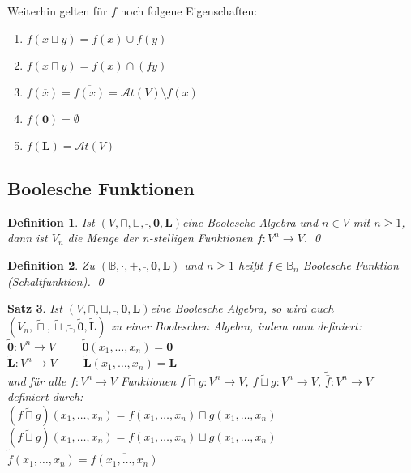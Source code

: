 \documentclass[ngerman]{scrartcl}
\theoremstyle{custom}
\newtheorem{mdef}{Definition} \numberwithin{mdef}{subsection}
\newtheorem{ms}[mdef]{Satz}
\newcommand{\0}{\mathbf{0}}
\newcommand{\1}{\mathbf{L}}
\newcommand{\at}{\mathcal{A}t}
\newcommand{\ba}{$(V, \sqcap, \sqcup, \bar~, \0, \1)$}
\begin{document}
Weiterhin gelten f\"ur $f$ noch folgene Eigenschaften:
\begin{enumerate}
\item $f(x \sqcup y) = f(x) \cup f(y)$
\item $f(x \sqcap y) = f(x) \cap (fy)$
\item $f(\overline{x}) = \overline{f(x)} = \at(V) \setminus f(x)$
\item $f(\0) = \emptyset$
\item $f(\1) = \at(V)$
\end{enumerate}

\subsection{Boolesche Funktionen}
\begin{mdef}
Ist \ba eine Boolesche Algebra und $n \in V$ mit $n \geq 1$, dann ist
$V_n$ die Menge der n-stelligen Funktionen $f: V^n \rightarrow V$.
\qed
\end{mdef}
\begin{mdef}
Zu $(\mathds{B}, \cdot, +, \bar~, \0, \1)$ und $n \geq 1$ hei\ss t $f
\in \mathds{B}_n$ \underline{Boolesche Funktion} (Schaltfunktion).
\qed
\end{mdef}

\begin{ms}
Ist \ba eine Boolesche Algebra, so wird auch $(V_n,
\widetilde{\sqcap}, \widetilde{\sqcup}, \widetilde{\bar~},
\widetilde{\0}, \widetilde{\1})$ zu einer Booleschen Algebra, indem
man definiert:\\
$\widetilde{\0}: V^n \rightarrow V \hspace{1cm} \widetilde{\0}(x_1,
\dots, x_n) = \0$\\
$\widetilde{\1}: V^n \rightarrow V \hspace{1cm} \widetilde{\1}(x_1,
\dots, x_n) = \1$\\
und f\"ur alle $f:V^n \rightarrow V$ Funktionen $f \widetilde{\sqcap}
g:V^n \rightarrow V$, $f \widetilde{\sqcup} g: V^n \rightarrow V$,
$\widetilde{\bar f}: V^n \rightarrow V$ definiert durch:\\
$(f \widetilde{\sqcap} g)(x_1, \dots, x_n) = f(x_1, \dots, x_n) \sqcap
g(x_1, \dots, x_n)$\\
$(f \widetilde{\sqcup} g)(x_1, \dots, x_n) = f(x_1, \dots, x_n) \sqcup
g(x_1, \dots, x_n)$\\
$\widetilde{\bar f}(x_1, \dots, x_n) = \overline{f(x_1, \dots, x_n)}$
\end{ms}
\end{document}
